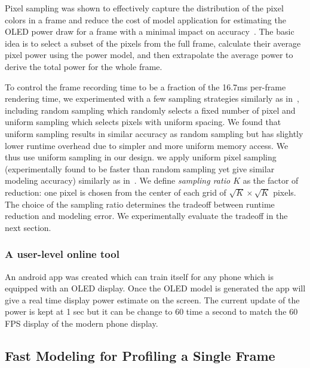 Pixel sampling was shown to effectively capture the distribution of
the pixel colors in a frame and reduce the cost of model application
for estimating the OLED power draw for a frame with a minimal impact
on accuracy~\cite{dong2009current}. The basic idea is to select a
subset of the pixels from the full frame, calculate their average
pixel power using the power model, and then extrapolate the average power to derive
the total power for the whole frame.
\fi

To control the frame recording time to be a fraction of the 16.7ms
per-frame rendering time,
we experimented with a few sampling strategies similarly as
in~\cite{dong2009current}, including random sampling which randomly
selects a fixed number of pixel and uniform sampling which selects
pixels with uniform spacing. We found that uniform sampling results in
similar accuracy as random sampling
but has slightly lower runtime overhead due to simpler
and more uniform memory access. We thus use uniform sampling in our
design.
\fi
we apply uniform pixel sampling (experimentally found to be faster than random sampling
yet give similar modeling accuracy) similarly as
in~\cite{dong2009current}.
We define {\em sampling ratio $K$} as the factor of reduction: one pixel is chosen from
the center of each grid of
$\sqrt{K}\times\sqrt{K}$ pixels.
The choice of the sampling ratio determines the tradeoff between
runtime reduction and modeling error.
We experimentally evaluate the tradeoff in the next section.

\subsubsection{A user-level online tool}

An android app was created which can train itself for any phone which is equipped with an
OLED display. Once the OLED model is generated the app will give a real time display
power estimate on the screen. The current update of the power is kept at 1 sec but it can
be change to 60 time a second to match the 60 FPS display of the modern phone display.
\fi





\subsection{Fast Modeling for Profiling a Single Frame}
\label{subsec:fast}

